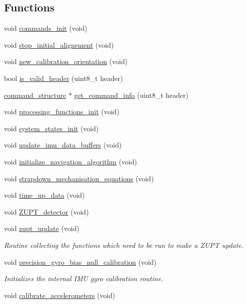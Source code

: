 \subsection*{\-Functions}
\begin{DoxyCompactItemize}
\item 
void \hyperlink{group__control__tables_ga3e9ed14716fd984977306110fbf28de0}{commands\-\_\-init} (void)
\item 
void \hyperlink{group__control__tables_ga8c4a627db87a50d5f3de3755eef48222}{stop\-\_\-initial\-\_\-alignement} (void)
\item 
void \hyperlink{group__control__tables_gad49f6a65369961b5d34c5353f3afdf4d}{new\-\_\-calibration\-\_\-orientation} (void)
\item 
bool \hyperlink{group__control__tables_ga93c567d32019e258ebc253b37fabde6c}{is\-\_\-valid\-\_\-header} (uint8\-\_\-t header)
\item 
\hyperlink{structcommand__structure}{command\-\_\-structure} $\ast$ \hyperlink{group__control__tables_ga95d9006725f04b028d795b3a3d9b4572}{get\-\_\-command\-\_\-info} (uint8\-\_\-t header)
\item 
void \hyperlink{group__control__tables_gab9fa06115589056892bdb7bb02b138c8}{processing\-\_\-functions\-\_\-init} (void)
\item 
void \hyperlink{group__control__tables_gae8c28d3d1938044d7d44c2e587542ff0}{system\-\_\-states\-\_\-init} (void)
\item 
void \hyperlink{group__control__tables_gaae1bbd924940610e1709300d40ca5a0f}{update\-\_\-imu\-\_\-data\-\_\-buffers} (void)
\item 
void \hyperlink{group__control__tables_ga8b0f8dc8c2ae1ff3f5e4f27284cf8e77}{initialize\-\_\-navigation\-\_\-algorithm} (void)
\item 
void \hyperlink{group__control__tables_ga9169808fbcb9f517deb908960a69ca7a}{strapdown\-\_\-mechanisation\-\_\-equations} (void)
\item 
void \hyperlink{group__control__tables_gac80ad2aa648edb47edb8f62883cb2a7d}{time\-\_\-up\-\_\-data} (void)
\item 
void \hyperlink{group__control__tables_gaf0b7424f50d37755b6b0736808082299}{\-Z\-U\-P\-T\-\_\-detector} (void)
\item 
void \hyperlink{group__control__tables_ga0b4ee34435eebb426eb367120ee79d72}{zupt\-\_\-update} (void)
\begin{DoxyCompactList}\small\item\em \-Routine collecting the functions which need to be run to make a \-Z\-U\-P\-T update. \end{DoxyCompactList}\item 
void \hyperlink{group__control__tables_ga71833d5eb4e7c71baaaa9e707a6c1f8d}{precision\-\_\-gyro\-\_\-bias\-\_\-null\-\_\-calibration} (void)
\begin{DoxyCompactList}\small\item\em \-Initializes the internal \-I\-M\-U gyro calibration routine. \end{DoxyCompactList}\item 
void \hyperlink{group__control__tables_gabb3f28a44a35898c77d789734914c4c2}{calibrate\-\_\-accelerometers} (void)
\end{DoxyCompactItemize}
